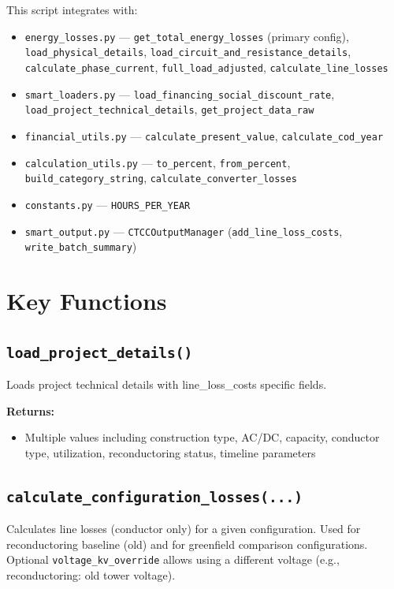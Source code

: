 \documentclass[ctcc_full_documentation.tex]{subfiles}
\begin{document}
This script integrates with:
\begin{itemize}
    \item \texttt{energy\_losses.py} --- \texttt{get\_total\_energy\_losses} (primary config), \texttt{load\_physical\_details}, \texttt{load\_circuit\_and\_resistance\_details}, \texttt{calculate\_phase\_current}, \texttt{full\_load\_adjusted}, \texttt{calculate\_line\_losses}
    \item \texttt{smart\_loaders.py} --- \texttt{load\_financing\_social\_discount\_rate}, \texttt{load\_project\_technical\_details}, \texttt{get\_project\_data\_raw}
    \item \texttt{financial\_utils.py} --- \texttt{calculate\_present\_value}, \texttt{calculate\_cod\_year}
    \item \texttt{calculation\_utils.py} --- \texttt{to\_percent}, \texttt{from\_percent}, \texttt{build\_category\_string}, \texttt{calculate\_converter\_losses}
    \item \texttt{constants.py} --- \texttt{HOURS\_PER\_YEAR}
    \item \texttt{smart\_output.py} --- \texttt{CTCCOutputManager} (\texttt{add\_line\_loss\_costs}, \texttt{write\_batch\_summary})
\end{itemize}

\section{Key Functions}

\subsection{\texttt{load\_project\_details()}}

Loads project technical details with line\_loss\_costs specific fields.

\textbf{Returns:}
\begin{itemize}
    \item Multiple values including construction type, AC/DC, capacity, conductor type, utilization, reconductoring status, timeline parameters
\end{itemize}

\subsection{\texttt{calculate\_configuration\_losses(...)}}

Calculates line losses (conductor only) for a given configuration. Used for reconductoring baseline (old) and for greenfield comparison configurations. Optional \texttt{voltage\_kv\_override} allows using a different voltage (e.g., reconductoring: old tower voltage).
\end{document}
